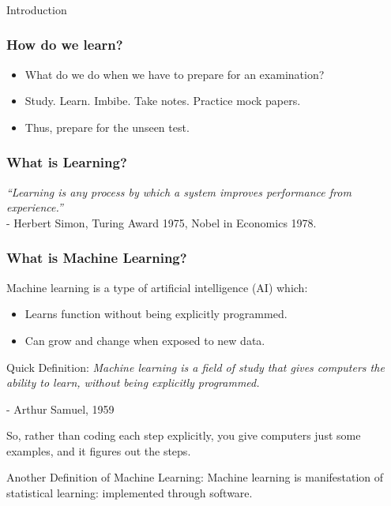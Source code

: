 \begin{frame}[fragile]\frametitle{}
\begin{center}
{\Large Introduction}
\end{center}
\end{frame}

\begin{frame}[fragile]\frametitle{How do we learn?}
\begin{itemize}
	\item What do we do when we have to prepare for an examination? 
	\item Study. Learn. Imbibe. Take notes. Practice mock papers.
	\item  Thus,  prepare for the unseen test.
\end{itemize}
\end{frame}

\begin{frame}[fragile]\frametitle{What is Learning?}
\begin{center}
{\em ``Learning is any process by which a system improves performance from experience.'' \\}
- Herbert Simon, Turing Award 1975, Nobel in Economics 1978.
\end{center}

\end{frame}



\begin{frame}[fragile]\frametitle{What is Machine Learning?}
Machine learning is a type of artificial intelligence (AI) which:
\begin{itemize}
\item Learns function without being explicitly programmed. 
\item Can grow and change when exposed to new data. 
\end{itemize}

Quick Definition:
{\it Machine learning is a field of study that gives computers the ability to learn, without being explicitly programmed.}

- Arthur Samuel, 1959

So, rather than coding each step explicitly, you give computers just some examples, and it figures out the steps.


Another Definition of Machine Learning:
Machine learning is manifestation of statistical learning: implemented through software.
\end{frame}


